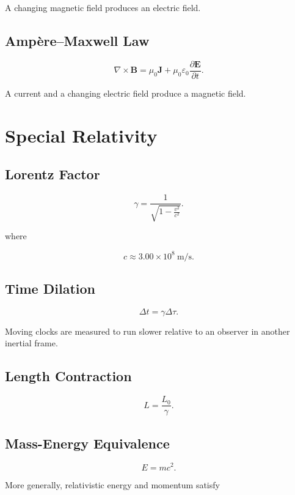 \documentclass[11pt,a4paper]{article}
\begin{document}
A changing magnetic field produces an electric field.

\subsection{Amp\`ere--Maxwell Law}

\[
\nabla\times\bm{B}
=
\mu_0\bm{J}
+
\mu_0\varepsilon_0
\frac{\partial\bm{E}}{\partial t}.
\]

A current and a changing electric field produce a magnetic field.

\section{Special Relativity}

\subsection{Lorentz Factor}

\[
\gamma=
\frac{1}{\sqrt{1-\frac{v^2}{c^2}}}.
\]

where

\[
c\approx3.00\times10^8\ \mathrm{m/s}.
\]

\subsection{Time Dilation}

\[
\Delta t=\gamma\Delta\tau.
\]

Moving clocks are measured to run slower relative to an observer in another inertial frame.

\subsection{Length Contraction}

\[
L=\frac{L_0}{\gamma}.
\]

\subsection{Mass-Energy Equivalence}

\[
E=mc^2.
\]

More generally, relativistic energy and momentum satisfy
\end{document}
